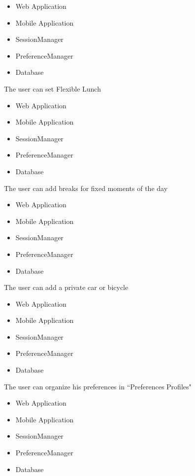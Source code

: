 \begin{itemize}
\begin{itemize}[leftmargin=1in]
 		\item Web Application
 		\item Mobile Application
 		\item SessionManager
 		\item PreferenceManager
 		\item Database
 	\end{itemize}
 	\subitem[G5.7] The user can set Flexible Lunch
 	\begin{itemize}[leftmargin=1in]
 		\item Web Application
 		\item Mobile Application
 		\item SessionManager
 		\item PreferenceManager
 		\item Database
 	\end{itemize}
 	\subitem[G5.8] The user can add breaks for fixed moments of the day
 	\begin{itemize}[leftmargin=1in]
 		\item Web Application
 		\item Mobile Application
 		\item SessionManager
 		\item PreferenceManager
 		\item Database
 	\end{itemize}
 	\subitem[G5.9] The user can add a private car or bicycle
 	\begin{itemize}[leftmargin=1in]
 		\item Web Application
 		\item Mobile Application
 		\item SessionManager
 		\item PreferenceManager
 		\item Database
 	\end{itemize}
 	\subitem[G5.10] The user can organize his preferences in “Preferences Profiles"
 	\begin{itemize}[leftmargin=1in]
 		\item Web Application
 		\item Mobile Application
 		\item SessionManager
 		\item PreferenceManager
 		\item Database
 	\end{itemize}
 \vspace{0.5cm}
 

\end{itemize}
